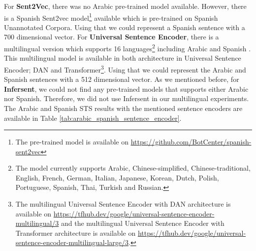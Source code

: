 For \textbf{Sent2Vec}, there was no Arabic pre-trained model available. However, there is a Spanish Sent2vec model\footnote{The pre-trained model is available on \url{https://github.com/BotCenter/spanish-sent2vec}} available which is pre-trained on Spanish Unannotated Corpora. Using that we could represent a Spanish sentence with a 700 dimensional vector. For \textbf{Universal Sentence Encoder}, there is a multilingual version which supports 16 languages\footnote{The model currently supports Arabic, Chinese-simplified, Chinese-traditional, English, French, German, Italian, Japanese, Korean, Dutch, Polish, Portuguese, Spanish, Thai, Turkish and Russian.} including Arabic and Spanish \cite{yang-etal-2020-multilingual}. This multilingual model is available in both architecture in Universal Sentence Encoder; DAN and Transformer\footnote{The multilingual Universal Sentence Encoder with DAN architecture is available on \url{https://tfhub.dev/google/universal-sentence-encoder-multilingual/3} and the multilingual Universal Sentence Encoder with Transformer architecture is available on \url{https://tfhub.dev/google/universal-sentence-encoder-multilingual-large/3}.}. Using that we could represent the Arabic and Spanish sentences with a 512 dimensional vector. As we mentioned before, for \textbf{Infersent}, we could not find any pre-trained models that supports either Arabic nor Spanish. Therefore, we did not use Infersent in our multilingual experiments. The Arabic and Spanish STS results with the mentioned sentence encoders are available in Table \ref{tab:arabic_spanish_sentence_encoder}.


